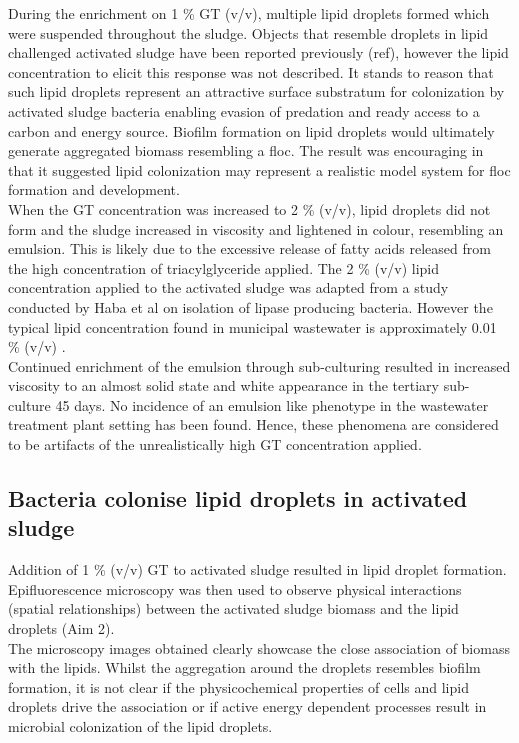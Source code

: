 \documentclass[11pt]{article}
\begin{document}
During the enrichment on 1 \% GT (v/v), multiple lipid droplets formed which were suspended throughout the sludge. Objects that resemble droplets in lipid challenged activated sludge have been reported previously (ref), however the lipid concentration to elicit this response was not described. It stands to reason that such lipid droplets represent an attractive surface substratum for colonization by activated sludge bacteria enabling evasion of predation and ready access to a carbon and energy source. Biofilm formation on lipid droplets would ultimately generate aggregated biomass resembling a floc. The result was encouraging in that it suggested lipid colonization may represent a realistic model system for floc formation and development. \\

When the GT concentration was increased to 2 \% (v/v), lipid droplets did not form and the sludge increased in viscosity and lightened in colour, resembling an emulsion. This is likely due to the excessive release of fatty acids released from the high concentration of triacylglyceride applied. The 2 \% (v/v) lipid concentration applied to the activated sludge was adapted from a study conducted by Haba et al \cite{haba2000isolation} on isolation of lipase producing bacteria. However the typical lipid concentration found in municipal wastewater is approximately 0.01 \% (v/v) \cite{Forster_92}. \\

Continued enrichment of the emulsion through sub-culturing resulted in increased viscosity to an almost solid state and white appearance in the tertiary sub-culture 45 days. No incidence of an emulsion like phenotype in the wastewater treatment plant setting has been found. Hence, these phenomena are considered to be artifacts of the unrealistically high GT concentration applied.

\subsection{Bacteria colonise lipid droplets in activated sludge}
Addition of 1 \% (v/v) GT to activated sludge resulted in lipid droplet formation. Epifluorescence microscopy was then used to observe physical interactions (spatial relationships) between the activated sludge biomass and the lipid droplets (Aim 2). \\

The microscopy images obtained clearly showcase the close association of biomass with the lipids. Whilst the aggregation around the droplets resembles biofilm formation, it is not clear if the physicochemical properties of cells and lipid droplets drive the association or if active energy dependent processes result in microbial colonization of the lipid droplets. \\
\end{document}
